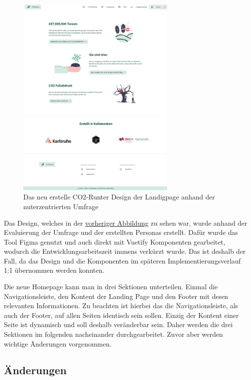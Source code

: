 \begin{figure}[H]
    \centering
    \includegraphics[width=0.7\textwidth]{images/06/HomePage-Design.jpeg}
    \caption{Das neu erstelle CO2-Runter Design der Landigpage anhand der nuterzentrierten Umfrage}
    \label{fig:new-co2runter-homepage-design}
\end{figure}

Das Design, welches in der \hyperref[fig:new-co2runter-homepage-design]{vorheriger Abbildung} zu sehen war, wurde anhand der Evaluierung der Umfrage und der erstellten Personas erstellt.
Dafür wurde das Tool Figma genutzt und auch direkt mit Vuetify Komponenten gearbeitet, wodurch die Entwicklungsarbeitszeit immens verkürzt wurde.
Das ist deshalb der Fall, da das Design und die Komponenten im späteren Implementierungsverlauf 1:1 übernommen werden konnten.

Die neue Homepage kann man in drei Sektionen unterteilen.
Einmal die Navigationsleiste, den Kontent der Landing Page und den Footer mit desen relevanten Informationen.
Zu beachten ist hierbei das die Navigationsleiste, als auch der Footer, auf allen Seiten identisch sein sollen.
Einzig der Kontent einer Seite ist dynamisch und soll deshalb veränderbar sein.
Daher werden die drei Sektionen im folgenden nacheinander durchgearbeitet.
Zuvor aber werden wichtige Änderungen vorgenommen.

\subsection{Änderungen}

